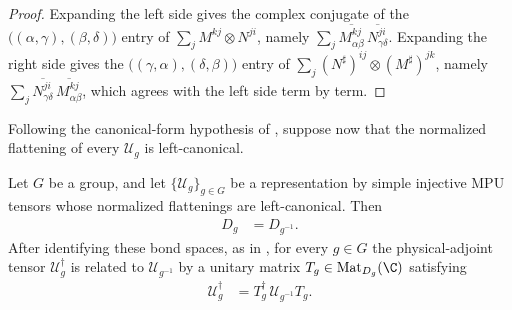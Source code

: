 \begin{proof}\leanok
    Expanding the left side gives the complex conjugate of the
    $\bigl((\alpha,\gamma),(\beta,\delta)\bigr)$ entry of
    $\sum_j M^{kj}\otimes N^{ji}$, namely
    $\sum_j\overline{M^{kj}_{\alpha\beta}}\,
        \overline{N^{ji}_{\gamma\delta}}$.
    Expanding the right side gives the
    $\bigl((\gamma,\alpha),(\delta,\beta)\bigr)$ entry of
    $\sum_j (N^\sharp)^{ij}\otimes(M^\sharp)^{jk}$, namely
    $\sum_j\overline{N^{ji}_{\gamma\delta}}\,
        \overline{M^{kj}_{\alpha\beta}}$,
    which agrees with the left side term by term.
\end{proof}

Following the canonical-form hypothesis of
\cite[lines~1552--1557]{FrancoRubio2025MPUGauging}, suppose now that the
normalized flattening of every $\mathcal U_g$ is left-canonical.

\begin{lemma}
    \label{thm:mpug_dagger_inverse_gauge}
    \leanok
    Let $G$ be a group, and let
    $\{\mathcal U_g\}_{g\in G}$ be a representation by simple injective MPU
    tensors whose normalized flattenings are left-canonical.  Then
    \begin{align}
        D_g & =D_{g^{-1}}.
        \label{eq:mpug_dagger_inverse_bond_dimension}
    \end{align}
    After identifying these bond spaces, as in
    \cite[lines~1552--1557]{FrancoRubio2025MPUGauging}, for every $g\in G$ the
    physical-adjoint tensor $\mathcal U_g^\dagger$ is related to
    $\mathcal U_{g^{-1}}$ by a unitary matrix
    $T_g\in\operatorname{Mat}_{D_g}(\C)$ satisfying
    \begin{align}
        \mathcal U_g^\dagger
         & =T_g^\dagger\,\mathcal U_{g^{-1}}T_g.
        \label{eq:mpug_dagger_inverse_gauge}
    \end{align}
\end{lemma}

